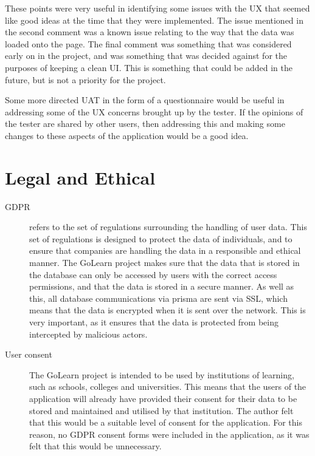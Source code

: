 \documentclass[11pt, a4paper,twoside]{report}
\theoremstyle{plain} %
\theoremstyle{definition} %
\numberwithin{equation}{chapter}
\begin{document}
These points were very useful in identifying some issues with the UX that
seemed like good ideas at the time that they were implemented. The issue
mentioned in the second comment was a known issue relating to the way that the
data was loaded onto the page. The final comment was something that was
considered early on in the project, and was something that was decided against
for the purposes of keeping a clean UI\@. This is something that could be added
in the future, but is not a priority for the project.

Some more directed UAT in the form of a questionnaire would be useful in
addressing some of the UX concerns brought up by the tester. If the opinions of
the tester are shared by other users, then addressing this and making some
changes to these aspects of the application would be a good idea.

\chapter{Legal and Ethical}\label{ch:legalandethical}

\begin{description}
    \item[GDPR\cite{gdpr}] {
        refers to the set of regulations surrounding the handling of user
        data. This set of regulations is designed to protect the data of
        individuals, and to ensure that companies are handling the data in a
        responsible and ethical manner. The GoLearn project makes sure that
        the data that is stored in the database can only be accessed by users
        with the correct access permissions, and that the data is stored in a
        secure manner. As well as this, all database communications via prisma
        are sent via SSL, which means that the data is encrypted when it is
        sent over the network. This is very important, as it ensures that the
        data is protected from being intercepted by malicious actors.
        }

    \item[User consent] {
        The GoLearn project is intended to be used by institutions of learning,
        such as schools, colleges and universities. This means that the users
        of the application will already have provided their consent for their
        data to be stored and maintained and utilised by that institution. The
        author felt that this would be a suitable level of consent for the
        application. For this reason, no GDPR consent forms were included in
        the application, as it was felt that this would be unnecessary.
        }
\end{description}
\end{document}
